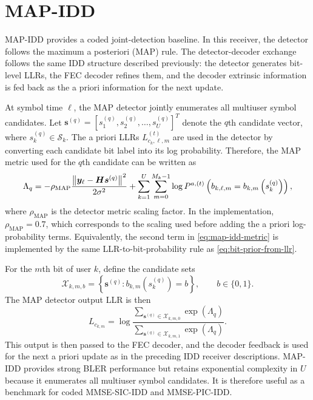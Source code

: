 \section{MAP-IDD}

MAP-IDD provides a coded joint-detection baseline. In this receiver, the detector follows the maximum a posteriori (MAP) rule. The detector-decoder exchange follows the same IDD structure described previously: the detector generates bit-level LLRs, the FEC decoder refines them, and the decoder extrinsic information is fed back as the a priori information for the next update.

At symbol time $\ell$, the MAP detector jointly enumerates all multiuser symbol candidates. Let
$\bm{s}^{(q)}=[s^{(q)}_1,s^{(q)}_2,\ldots,s^{(q)}_U]^T$ denote the $q$th candidate vector, where $s^{(q)}_k\in\mathcal{S}_k$. The a priori LLRs $L^{(t)}_{c_k,\ell,m}$ are used in the detector by converting each candidate bit label into its log probability. Therefore, the MAP metric used for the $q$th candidate can be written as
\begin{equation}
    \Lambda_q
    =
    -\rho_{\mathrm{MAP}}
    \frac{\left\lVert \bm{y}_\ell-\bm{H}\bm{s}^{(q)} \right\rVert^2}{2\sigma^2}
    +
    \sum_{k=1}^{U}
    \sum_{m=0}^{M_k-1}
    \log P^{a,(t)}
    \left(
    b_{k,\ell,m}
    =
    b_{k,m}\left(s^{(q)}_k\right)
    \right),
    \label{eq:map-idd-metric}
\end{equation}
where $\rho_{\mathrm{MAP}}$ is the detector metric scaling factor. In the implementation, $\rho_{\mathrm{MAP}}=0.7$, which corresponds to the scaling used before adding the a priori log-probability terms. Equivalently, the second term in \eqref{eq:map-idd-metric} is implemented by the same LLR-to-bit-probability rule as \eqref{eq:bit-prior-from-llr}.

For the $m$th bit of user $k$, define the candidate sets
\begin{equation}
    \mathcal{X}_{k,m,b}
    =
    \left\{
    \bm{s}^{(q)}:
    b_{k,m}\left(s^{(q)}_k\right)=b
    \right\},
    \qquad b\in\{0,1\}.
\end{equation}
The MAP detector output LLR is then
\begin{equation}
    L_{c_{k,m}}
    =
    \log
    \frac{
    \sum_{\bm{s}^{(q)}\in\mathcal{X}_{k,m,0}}
    \exp(\Lambda_q)}
    {
    \sum_{\bm{s}^{(q)}\in\mathcal{X}_{k,m,1}}
    \exp(\Lambda_q)} .
    \label{eq:map-idd-llr}
\end{equation}
This output is then passed to the FEC decoder, and the decoder feedback is used for the next a priori update as in the preceding IDD receiver descriptions. MAP-IDD provides strong BLER performance but retains exponential complexity in $U$ because it enumerates all multiuser symbol candidates. It is therefore useful as a benchmark for coded MMSE-SIC-IDD and MMSE-PIC-IDD.

